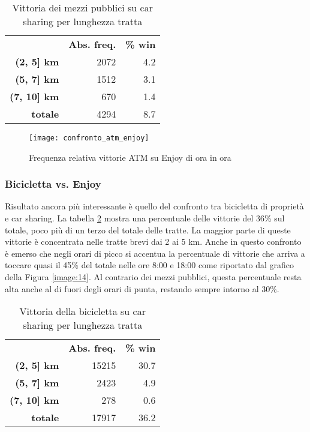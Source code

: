 \begin{table}
	\centering
	\begin{tabular}{ | r r r | }
		\hline
		& \textbf{Abs. freq.} & \textbf{\% win} \\
		\textbf{(2, 5] km} & 2072 & 4.2 \\
		\textbf{(5, 7] km} & 1512 & 3.1 \\
		\textbf{(7, 10] km} & 670 & 1.4 \\
		\hline
		\textbf{totale} & 4294 & 8.7 \\
		\hline
	\end{tabular}
	\caption{Vittoria dei mezzi pubblici su car sharing per lunghezza tratta}
	\label{table:5}
\end{table}

\begin{figure}
	\centering
	\texttt{[image: confronto\_atm\_enjoy]}
	\caption{Frequenza relativa vittorie ATM su Enjoy di ora in ora}
	\label{image:13}
\end{figure}

\subsubsection{Bicicletta vs. Enjoy}

Risultato ancora più interessante è quello del confronto tra bicicletta di proprietà e car sharing. La tabella \ref{table:6} mostra una percentuale delle vittorie del 36\% sul totale, poco più di un terzo del totale delle tratte. La maggior parte di queste vittorie è concentrata nelle tratte brevi dai 2 ai 5 km. Anche in questo confronto è emerso che negli orari di picco si accentua la percentuale di vittorie che arriva a toccare quasi il 45\% del totale nelle ore 8:00 e 18:00 come riportato dal grafico della Figura \ref{image:14}. Al contrario dei mezzi pubblici, questa percentuale resta alta anche al di fuori degli orari di punta, restando sempre intorno al 30\%.

\begin{table}[H]
	\centering
	\begin{tabular}{ | r r r | }
		\hline
		& \textbf{Abs. freq.} & \textbf{\% win} \\
		\textbf{(2, 5] km} & 15215 & 30.7 \\
		\textbf{(5, 7] km} & 2423 & 4.9 \\
		\textbf{(7, 10] km} & 278 & 0.6 \\
		\hline
		\textbf{totale} & 17917 & 36.2 \\
		\hline
	\end{tabular}
	\caption{Vittoria della bicicletta su car sharing per lunghezza tratta}
	\label{table:6}
\end{table}


